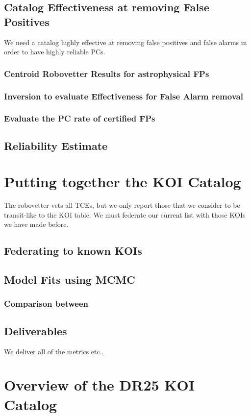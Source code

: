\documentclass[onecolumn]{aastex6}
\begin{document}
\subsection{Catalog Effectiveness at removing False Positives}
We need a catalog highly effective at removing false positives and false alarms in order to have highly reliable PCs.
\subsubsection{Centroid Robovetter Results for astrophysical FPs}
\subsubsection{Inversion to evaluate Effectiveness for False Alarm removal}
\subsubsection{Evaluate the PC rate of certified FPs}
\subsection{Reliability Estimate}


\section{Putting together the KOI Catalog}
The robovetter vets all TCEs, but we only report those that we consider to be transit-like to the KOI table. We must federate our current list with those KOIs we have made before.
\subsection{Federating to known KOIs}

\subsection{Model Fits using MCMC}
\label{s:transitfits}

\subsubsection{Comparison between }
\subsection{Deliverables}
We deliver all of the metrics etc..

\section{Overview of the DR25 KOI Catalog}
\end{document}
